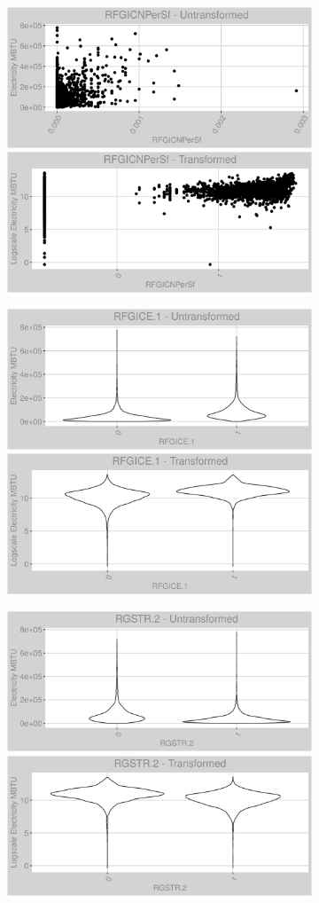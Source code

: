 \FloatBarrier
\newpage
\begin{figure}
\centering
\begin{subfigure}{1\textwidth}
\centering
\includegraphics[width=.49\textwidth, height=0.3\textheight]{Images/electricity_psf_var_original_6.png}
\includegraphics[width=.49\textwidth, height=0.3\textheight]{Images/electricity_psf_var_transformed_6.png}
\end{subfigure}
\begin{subfigure}{1\textwidth}
\centering
\includegraphics[width=.49\textwidth, height=0.3\textheight]{Images/electricity_psf_var_original_7.png}
\includegraphics[width=.49\textwidth, height=0.3\textheight]{Images/electricity_psf_var_transformed_7.png}
\end{subfigure}
\begin{subfigure}{1\textwidth}
\centering
\includegraphics[width=.49\textwidth, height=0.3\textheight]{Images/electricity_psf_var_original_8.png}
\includegraphics[width=.49\textwidth, height=0.3\textheight]{Images/electricity_psf_var_transformed_8.png}
\end{subfigure}
\end{figure}
